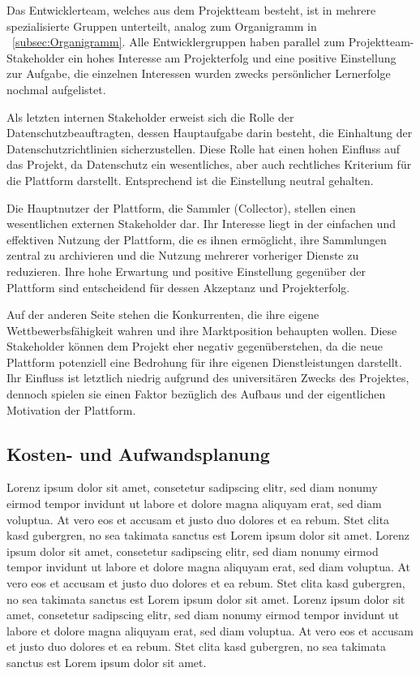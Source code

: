 Das Entwicklerteam, welches aus dem Projektteam besteht, ist in mehrere spezialisierte Gruppen unterteilt, analog zum Organigramm in ~\ref{subsec:Organigramm}.
Alle Entwicklergruppen haben parallel zum Projektteam-Stakeholder ein hohes Interesse am Projekterfolg und eine positive Einstellung zur Aufgabe, die einzelnen Interessen wurden zwecks persönlicher Lernerfolge nochmal aufgelistet. \par

Als letzten internen Stakeholder erweist sich die Rolle der Datenschutzbeauftragten, dessen Hauptaufgabe darin besteht, die Einhaltung der Datenschutzrichtlinien sicherzustellen.
Diese Rolle hat einen hohen Einfluss auf das Projekt, da Datenschutz ein wesentliches, aber auch rechtliches Kriterium für die Plattform darstellt.
Entsprechend ist die Einstellung neutral gehalten. \par


Die Hauptnutzer der Plattform, die Sammler (Collector), stellen einen wesentlichen externen Stakeholder dar.
Ihr Interesse liegt in der einfachen und effektiven Nutzung der Plattform, die es ihnen ermöglicht, ihre Sammlungen zentral zu archivieren und die Nutzung mehrerer vorheriger Dienste zu reduzieren.
Ihre hohe Erwartung und positive Einstellung gegenüber der Plattform sind entscheidend für dessen Akzeptanz und Projekterfolg. \par

Auf der anderen Seite stehen die Konkurrenten, die ihre eigene Wettbewerbsfähigkeit wahren und ihre Marktposition behaupten wollen.
Diese Stakeholder können dem Projekt eher negativ gegenüberstehen, da die neue Plattform potenziell eine Bedrohung für ihre eigenen Dienstleistungen darstellt.
Ihr Einfluss ist letztlich niedrig aufgrund des universitären Zwecks des Projektes, dennoch spielen sie einen Faktor bezüglich des Aufbaus und der eigentlichen Motivation der Plattform. \par







\subsection{Kosten- und Aufwandsplanung}\label{subsec:Kosten-Aufwandsplanung}
Lorenz ipsum dolor sit amet, consetetur sadipscing elitr, sed diam nonumy eirmod tempor invidunt ut labore et dolore magna aliquyam erat, sed diam voluptua.
At vero eos et accusam et justo duo dolores et ea rebum.
Stet clita kasd gubergren, no sea takimata sanctus est Lorem ipsum dolor sit amet.
Lorenz ipsum dolor sit amet, consetetur sadipscing elitr, sed diam nonumy eirmod tempor invidunt ut labore et dolore magna aliquyam erat, sed diam voluptua.
At vero eos et accusam et justo duo dolores et ea rebum.
Stet clita kasd gubergren, no sea takimata sanctus est Lorem ipsum dolor sit amet.
Lorenz ipsum dolor sit amet, consetetur sadipscing elitr, sed diam nonumy eirmod tempor invidunt ut labore et dolore magna aliquyam erat, sed diam voluptua.
At vero eos et accusam et justo duo dolores et ea rebum.
Stet clita kasd gubergren, no sea takimata sanctus est Lorem ipsum dolor sit amet.

